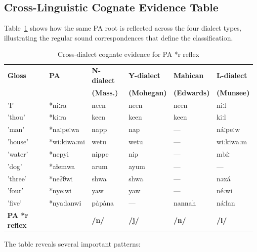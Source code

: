 \subsection{Cross-Linguistic Cognate Evidence Table}

Table~\ref{tab:cognate-dialect} shows how the same PA root is reflected
across the four dialect types, illustrating the regular sound
correspondences that define the classification.

\begin{table}[h]
\centering
\caption{Cross-dialect cognate evidence for PA *r reflex}
\label{tab:cognate-dialect}
\small
\begin{tabular}{llllll}
\toprule
\textbf{Gloss} & \textbf{PA} & \textbf{N-dialect} & \textbf{Y-dialect} & \textbf{Mahican} & \textbf{L-dialect} \\
 & & \textbf{(Mass.)} & \textbf{(Mohegan)} & \textbf{(Edwards)} & \textbf{(Munsee)} \\
\midrule
'I' & *niːra & neen & neen & neen & niːl \\
'thou' & *kiːra & keen & keen & keen & kiːl \\
'man' & *naːpeːwa & napp & nap & --- & náːpeːw \\
'house' & *wiːkiwaːmi & wetu & wetu & --- & wiːkiwaːm \\
'water' & *nepyi & nippe & nip & --- & mbíː \\
'dog' & *aɬemwa & arum & ayum & --- & --- \\
'three' & *neʔθwi & shwa & shwa & --- & nəxá \\
'four' & *nyeːwi & yaw & yaw & --- & néːwi \\
'five' & *nyaːlanwi & pàpàna & --- & nannah & náːlan \\
\midrule
\textbf{PA *r reflex} & & \textbf{/n/} & \textbf{/j/} & \textbf{/n/} & \textbf{/l/} \\
\bottomrule
\end{tabular}
\end{table}

The table reveals several important patterns:

